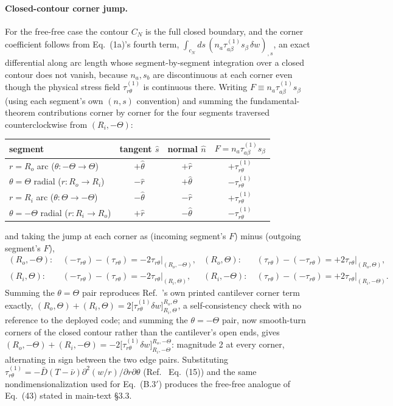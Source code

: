 \documentclass[11pt]{article}
\begin{document}
\paragraph{Closed-contour corner jump.} For the free-free case the
contour $C_N$ is the full closed boundary, and the corner coefficient
follows from Eq.~(1a)'s fourth term,
$\int_{c_N}\!ds\,(n_a\tau^{(1)}_{a\beta}s_\beta\,\delta w)_{,s}$, an
exact differential along arc length whose segment-by-segment integration
over a closed contour does not vanish, because $n_a,s_b$ are
discontinuous at each corner even though the physical stress field
$\tau^{(1)}_{r\theta}$ is continuous there. Writing
$F\equiv n_a\tau^{(1)}_{a\beta}s_\beta$ (using each segment's own
$(n,s)$ convention) and summing the fundamental-theorem contributions
corner by corner for the four segments traversed counterclockwise from
$(R_i,-\Theta)$:
\begin{center}
\begin{tabular}{lccc}
\toprule
segment & tangent $\hat s$ & normal $\hat n$ & $F=n_a\tau^{(1)}_{a\beta}s_\beta$\\
\midrule
$r=R_o$ arc ($\theta:-\Theta\to\Theta$) & $+\hat\theta$ & $+\hat r$ & $+\tau^{(1)}_{r\theta}$\\
$\theta=\Theta$ radial ($r:R_o\to R_i$) & $-\hat r$ & $+\hat\theta$ & $-\tau^{(1)}_{r\theta}$\\
$r=R_i$ arc ($\theta:\Theta\to-\Theta$) & $-\hat\theta$ & $-\hat r$ & $+\tau^{(1)}_{r\theta}$\\
$\theta=-\Theta$ radial ($r:R_i\to R_o$) & $+\hat r$ & $-\hat\theta$ & $-\tau^{(1)}_{r\theta}$\\
\bottomrule
\end{tabular}
\end{center}
and taking the jump at each corner as (incoming segment's $F$) minus
(outgoing segment's $F$),
\begin{align*}
(R_o,-\Theta):&\ (-\tau_{r\theta})-(\tau_{r\theta})=-2\tau_{r\theta}\big|_{(R_o,-\Theta)}, &
(R_o,\Theta):&\ (\tau_{r\theta})-(-\tau_{r\theta})=+2\tau_{r\theta}\big|_{(R_o,\Theta)},\\
(R_i,\Theta):&\ (-\tau_{r\theta})-(\tau_{r\theta})=-2\tau_{r\theta}\big|_{(R_i,\Theta)}, &
(R_i,-\Theta):&\ (\tau_{r\theta})-(-\tau_{r\theta})=+2\tau_{r\theta}\big|_{(R_i,-\Theta)}.
\end{align*}
Summing the $\theta=\Theta$ pair reproduces Ref.~\cite{seok1}'s own printed
cantilever corner term exactly,
$(R_o,\Theta)+(R_i,\Theta)=2\big[\tau^{(1)}_{r\theta}\delta w\big]^{R_o,\Theta}_{R_i,\Theta}$,
a self-consistency check with no reference to the deployed code; and
summing the $\theta=-\Theta$ pair, now smooth-turn corners of the closed
contour rather than the cantilever's open ends, gives
$(R_o,-\Theta)+(R_i,-\Theta)=-2\big[\tau^{(1)}_{r\theta}\delta w\big]^{R_o,-\Theta}_{R_i,-\Theta}$:
magnitude 2 at every corner, alternating in sign between the two edge
pairs. Substituting
$\tau^{(1)}_{r\theta}=-\bar D(T-\bar\nu)\partial^2(w/r)/\partial r\partial\theta$
(Ref.~\cite{seok1} Eq.~(15)) and the same nondimensionalization used for
Eq.~(B.3$'$) produces the free-free analogue of Eq.~(43) stated in
main-text \S3.3.
\end{document}
